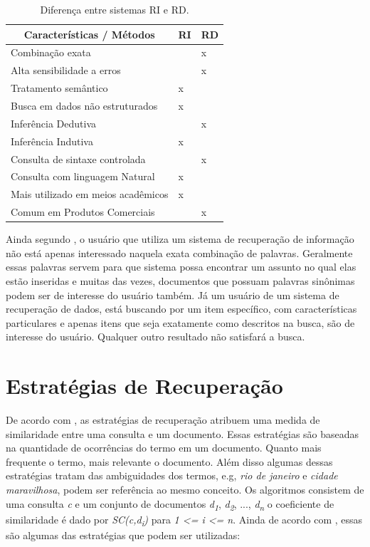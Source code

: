 \begin{table}[htb]
	\centering
	\caption{Diferença entre sistemas \ac{RI} e \ac{RD}.}
	\label{tab:RIxRD}
	\begin{tabular}{|m{7cm} | m{2cm} | m{2cm} |}

		\hline
		
		\multicolumn{1}{|c|}{\bfseries Características / Métodos } & \multicolumn{1}{c|}{\bfseries RI} & \multicolumn{1}{c|}{\bfseries RD}\\ \hline
		Combinação exata   					&		&	x 	\\ \hline
		Alta sensibilidade a erros   			&		&	x  	\\ \hline
		Tratamento semântico   				&	x 	&	 	\\ \hline
		Busca em dados não estruturados   	&	x 	&	 	\\ \hline
		Inferência Dedutiva  					&		&	x  	\\ \hline
		Inferência Indutiva   					&	x 	&	 	\\ \hline
		Consulta de sintaxe controlada   		&		&	x 	\\ \hline
		Consulta com linguagem Natural   	&	x 	&	 	\\ \hline
		Mais utilizado em meios acadêmicos   &	x 	&	 	\\ \hline
		Comum em Produtos Comerciais   	&		&	x 	\\ \hline
		
	\end{tabular}
\end{table}

Ainda segundo \cite{Fred2008}, o usuário que utiliza um sistema de recuperação de informação não está apenas interessado naquela exata combinação de palavras. Geralmente essas palavras servem para que sistema possa encontrar um assunto no qual elas estão inseridas e muitas das vezes, documentos que possuam palavras sinônimas podem ser de interesse do usuário também. Já um usuário de um sistema de recuperação de dados, está buscando por um item específico, com características particulares e apenas itens que seja exatamente como descritos na busca, são de interesse do usuário. Qualquer outro resultado não satisfará a busca.

\section{Estratégias de Recuperação}

De acordo com \cite{Grossman2004}, as estratégias de recuperação atribuem uma medida de similaridade entre uma consulta e um documento. Essas estratégias são baseadas na quantidade de ocorrências do termo em um documento. Quanto mais frequente o termo, mais relevante o documento. Além disso algumas dessas estratégias tratam das ambiguidades dos termos, e.g, \textit{rio de janeiro} e \textit{cidade maravilhosa}, podem ser referência ao mesmo conceito.
Os algoritmos consistem de uma consulta \textit{c} e um conjunto de documentos \textit{d\textsubscript{1}}, \textit{d\textsubscript{2}}, ..., \textit{d\textsubscript{n}} o coeficiente de similaridade é dado por \textit{SC(c,d\textsubscript{i})} para \textit{1 <= i <= n}.
Ainda de acordo com \cite{Grossman2004}, essas são algumas das estratégias que podem ser utilizadas:

